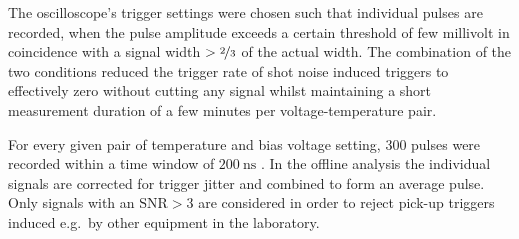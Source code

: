 The oscilloscope's trigger settings were chosen such that individual pulses are recorded, when the pulse amplitude exceeds a certain threshold of few millivolt in coincidence with a
 signal width $> \nicefrac{2}{3}$ of the actual width.
The combination of the two conditions reduced the trigger rate of shot noise induced triggers to effectively zero without cutting any signal
 whilst maintaining a short measurement duration of a few minutes per voltage-temperature pair. 

For every given pair of temperature and bias voltage setting, 300 pulses were recorded within a time window of $\SI{200}{\nano\second}$ . 
In the offline analysis the individual signals are corrected for trigger jitter and combined to form an average pulse. 
Only signals with an $\textrm{SNR}> 3$ are considered in order to
 reject pick-up triggers induced e.g.~by other equipment in the laboratory. 

